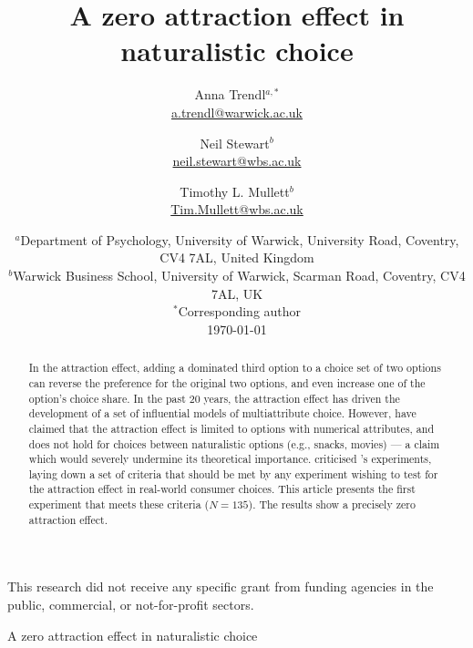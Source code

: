 \documentclass[12pt, a4paper]{article}
\title{}
\author{}
\date{}
\begin{document}
\title{A zero attraction effect in naturalistic choice}

\author{Anna Trendl$^{a,*}$ \\ \href{mailto:a.trendl@warwick.ac.uk}{a.trendl@warwick.ac.uk}\\
 \and Neil Stewart$^b$ \\ 
 \href{mailto:neil.stewart@wbs.ac.uk}{neil.stewart@wbs.ac.uk}
 \\ 
 \and Timothy L. Mullett$^b$ \\
 \href{mailto:Tim.Mullett@wbs.ac.uk}{Tim.Mullett@wbs.ac.uk}
 \\}
 
\date{
    $^a$Department of Psychology, University of Warwick, University Road, Coventry, CV4 7AL, United Kingdom\\
    $^b$Warwick Business School, University of Warwick, Scarman Road, Coventry, CV4 7AL, UK\\
    $^*$Corresponding author\\[2ex]%
    \today
}



\begin{titlepage}
\thispagestyle{empty}
\maketitle
\centering
    This research did not receive any specific grant from funding agencies in the public, commercial, or not-for-profit sectors.
\clearpage
\thispagestyle{empty}
\RaggedRight
\begin{center}
\LARGE{A zero attraction effect in naturalistic choice}
\end{center}
\begin{abstract}
\noindent
		In the attraction effect, adding a dominated third option to a choice set of two options can reverse the preference for the original two options, and even increase one of the option's choice share. In the past 20 years, the attraction effect has driven the development of a set of influential models of multiattribute choice. However,  have claimed that the attraction effect is limited to options with numerical attributes, and does not hold for choices between naturalistic options (e.g., snacks, movies) --- a claim which would severely undermine its theoretical importance.  criticised \citeauthor{Frederick2014}'s experiments, laying down a set of criteria that should be met by any experiment wishing to test for the attraction effect in real-world consumer choices. This article presents the first experiment that meets these criteria ($N=135$). The results show a precisely zero attraction effect.
\end{abstract}


\end{titlepage}
\end{document}
